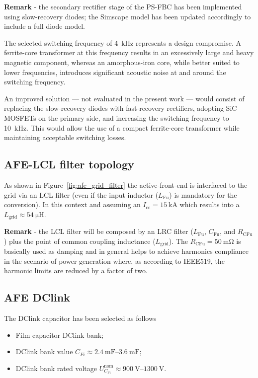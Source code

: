 \documentclass[11pt,a4paper]{scrartcl}
\begin{document}
\begin{onehalfspace}
\noindent\textbf{Remark} - the secondary rectifier stage of the PS-FBC has been implemented using
slow-recovery diodes; the Simscape model has been updated accordingly to
include a full diode model.

The selected switching frequency of \SI{4}{\kilo\hertz} represents a
design compromise. A ferrite-core transformer at this frequency results
in an excessively large and heavy magnetic component, whereas an
amorphous-iron core, while better suited to lower frequencies, introduces
significant acoustic noise at and around the switching frequency.

An improved solution — not evaluated in the present work — would consist
of replacing the slow-recovery diodes with fast-recovery rectifiers,
adopting SiC MOSFETs on the primary side, and increasing the switching
frequency to \SI{10}{\kilo\hertz}. This would allow the use of a
compact ferrite-core transformer while maintaining acceptable switching
losses.

\subsection{AFE-LCL filter topology}
As shown in Figure~\ref{fig:afe_grid_filter} the active-front-end is interfaced to the grid via an LCL filter (even if the input inductor ($L_\text{Fu}$) is mandatory for the conversion). In this context and assuming an $I_\text{cc}=\SI{15}{\kilo\ampere}$ which results into a $L_\text{grid} \approx\SI{54}{\micro\henry}$.

\noindent\textbf{Remark} - the LCL filter will be composed by an LRC filter ($L_\text{Fu}$, $C_\text{Fu}$, and $R_\text{CFu}$) plus the point of common coupling inductance ($L_\text{grid}$).
The $R_\text{CFu} = \SI{50}{\milli\ohm}$ is basically used as damping and in general helps to achieve harmonics compliance in the scenario of power generation where, as according to IEEE519, the harmonic limits are reduced by a factor of two.

\subsection{AFE DClink}
The DClink capacitor has been selected as follows
\begin{itemize}
	\item[--] Film capacitor DClink bank;
	\item[--] DClink bank value $C_{Fi} \approx \SI{2.4}{\milli\farad}–\SI{3.6}{\milli\farad}$;	
	\item[--] DClink bank rated voltage $U_{C_\text{Fi}}^\text{nom} \approx \SI{900}{\volt}–\SI{1300}{\volt}$.
\end{itemize}


\end{onehalfspace}
\end{document}
